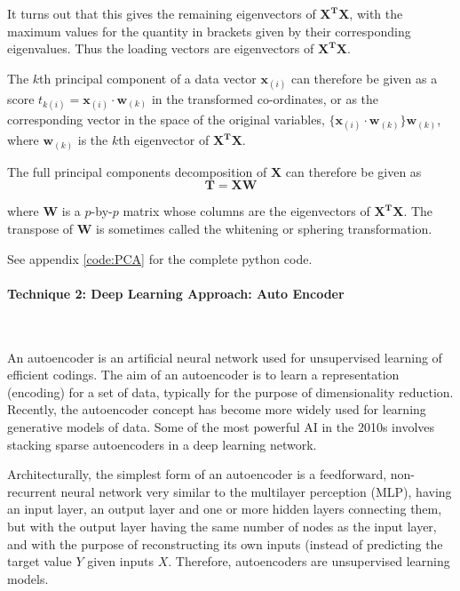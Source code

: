 \documentclass{mcmthesis}
\begin{document}
It turns out that this gives the remaining eigenvectors of $\mathbf{X^TX}$, with the maximum values for the quantity in brackets given by their corresponding eigenvalues. Thus the loading vectors are eigenvectors of $\mathbf{X^TX}$.

The $k$th principal component of a data vector $\mathbf{x}_{(i)}$ can therefore be given as a score $t_{k(i)} = \mathbf{x}_{(i)} \cdot \mathbf{w}_{(k)}$ in the transformed co-ordinates, or as the corresponding vector in the space of the original variables, $\{\mathbf{x}_{(i)} \cdot \mathbf{w}_{(k)}\} \mathbf{w}_{(k)}$, where $\mathbf{w}_{(k)}$ is the $k$th eigenvector of $\mathbf{X^TX}$.

The full principal components decomposition of $\mathbf{X}$ can therefore be given as
\begin{equation}
    \mathbf {T} =\mathbf {X} \mathbf {W}
\end{equation}

where $\mathbf{W}$ is a $p$-by-$p$ matrix whose columns are the eigenvectors of $\mathbf{X^TX}$. The transpose of $\mathbf{W}$ is sometimes called the whitening or sphering transformation.

See appendix \ref{code:PCA} for the complete python code. 

\paragraph{\textbf{Technique 2: Deep Learning Approach: Auto Encoder}}

~\smallskip

An autoencoder is an artificial neural network used for unsupervised learning of efficient codings. The aim of an autoencoder is to learn a representation (encoding) for a set of data, typically for the purpose of dimensionality reduction. Recently, the autoencoder concept has become more widely used for learning generative models of data. Some of the most powerful AI in the 2010s involves stacking sparse autoencoders in a deep learning network.

Architecturally, the simplest form of an autoencoder is a feedforward, non-recurrent neural network very similar to the multilayer perception (MLP), having an input layer, an output layer and one or more hidden layers connecting them, but with the output layer having the same number of nodes as the input layer, and with the purpose of reconstructing its own inputs (instead of predicting the target value $Y$ given inputs $X$. Therefore, autoencoders are unsupervised learning models.
\end{document}
